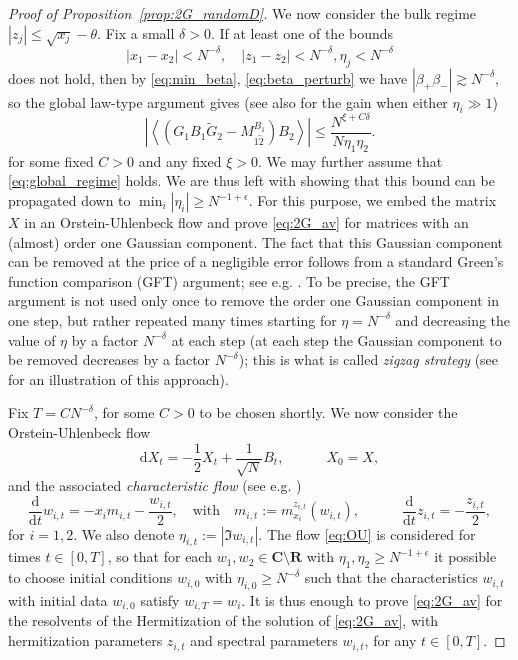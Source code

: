 \documentclass[10pt]{amsart}
\numberwithin{equation}{section}
\newcommand{\dif}{\mathrm{d}}
\newcommand{\R}{\mathbf{R}}
\newcommand{\C}{\mathbf{C}}
\begin{document}
\begin{proof}[Proof of Proposition~\ref{prop:2G_randomD}]
We now consider the bulk regime $|z_j|\le \sqrt{x_j}-\theta$. Fix a small $\delta>0$. If at least one of the bounds
\begin{equation}
|x_1-x_2|<N^{-\delta},\quad |z_1-z_2|<N^{-\delta},\eta_j<N^{-\delta}
\label{eq:global_regime}
\end{equation}
does not hold, then by \eqref{eq:min_beta}, \eqref{eq:beta_perturb} we have $|\beta_+\beta_-|\gtrsim N^{-\delta}$, so the global law-type argument gives (see also \cite[Appendix~B]{Multi_res_llaws} for the gain when either $\eta_i\gg 1$)
\begin{equation}
\left\vert\left\langle \left(G_1B_1\widetilde{G}_2 - M_{1\widetilde{2}}^{B_1}\right)B_2\right\rangle\right\vert \le \frac{N^{\xi+C\delta}}{N\eta_1\eta_2}.
\end{equation}
for some fixed $C>0$ and any fixed $\xi>0$. We may further assume that \eqref{eq:global_regime} holds. We are thus left with showing that this bound can be propagated down to $\min_i|\eta_i|\ge N^{-1+\epsilon}$. For this purpose, we embed the matrix $X$ in an Orstein-Uhlenbeck flow and prove \eqref{eq:2G_av} for matrices with an (almost) order one Gaussian component. The fact that this Gaussian component can be removed at the price of a negligible error follows from a standard Green's function comparison (GFT) argument;  see e.g. \cite[Section~5]{nonHermdecay}. To be precise, the GFT argument \cite[Section~5]{nonHermdecay} is not used only once to remove the order one Gaussian component in one step, but rather repeated many times starting for $\eta=N^{-\delta}$ and decreasing the value of $\eta$ by a factor $N^{-\delta}$ at each step (at each step the Gaussian component to be removed decreases by a factor $N^{-\delta}$); this is what is called \emph{zigzag strategy} (see \cite[Fig.~1-2]{nonHermdecay} for an illustration of this approach).


Fix $T=C N^{-\delta}$, for some $C>0$ to be chosen shortly. We now consider the Orstein-Uhlenbeck flow
\begin{equation}
\label{eq:OU}
\dif X_t =-\frac{1}{2} X_t +\frac{1}{\sqrt{N}}B_t, \qquad\quad X_0=X,
\end{equation}
and the associated \emph{characteristic flow} (see e.g. \cite[Eq.(5.3)-(5.4)]{Cipolloni_meso})
\begin{equation}
\frac{\dif}{\dif t} w_{i,t} = -x_i m_{i,t}-\frac{w_{i,t}}{2},\quad\text{with}\quad m_{i,t}:=m_{x_i}^{z_{i,t}}(w_{i,t}), \qquad\quad \frac{\dif}{\dif t} z_{i,t}=-\frac{z_{i,t}}{2},
\label{eq:char_flow}
\end{equation}
for $i=1,2$. We also denote $\eta_{i,t}:=|\Im w_{i,t}|$. The flow \eqref{eq:OU} is considered for times $t\in [0,T]$, so that for each $w_1,w_2\in\C\setminus\R$ with $\eta_1,\eta_2 \ge N^{-1+\epsilon}$ it possible to choose initial conditions $w_{i,0}$ with $\eta_{i,0}\ge N^{-\delta}$ such that the characteristics $w_{i,t}$ with initial data $w_{i,0}$ satisfy $w_{i,T}=w_i$. It is thus enough to prove \eqref{eq:2G_av} for the resolvents of the Hermitization of the solution of \eqref{eq:2G_av}, with hermitization parameters $z_{i,t}$ and spectral parameters $w_{i,t}$, for any $t\in [0,T]$. 


\end{proof}
\end{document}
